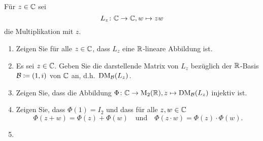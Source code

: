 \begin{question}
 Für $z \in \mathbb{C}$ sei
 \[
  L_z \colon \mathbb{C} \to \mathbb{C}, w \mapsto z w
 \]
 die Multiplikation mit $z$.
 \begin{enumerate}
  \item
   Zeigen Sie für alle $z \in \mathbb{C}$, dass $L_z$ eine $\mathbb{R}$-lineare Abbildung ist.
  \item
   Es sei $z \in \mathbb{C}$. Geben Sie die darstellende Matrix von $L_z$ bezüglich der $\mathbb{R}$-Basis $\mathcal{B} \coloneqq (1,i)$ von $\mathbb{C}$ an, d.h.\ $\operatorname{DM}_{\mathcal{B}}(L_z)$.
  \item
   Zeigen Sie, dass die Abbildung $\Phi \colon \mathbb{C} \to \operatorname{M}_2(\mathbb{R}), z \mapsto \operatorname{DM}_{\mathcal{B}}(L_z)$ injektiv ist.
  \item
   Zeigen Sie, dass $\Phi(1) = I_2$ und dass für alle $z, w \in \mathbb{C}$
   \[
    \Phi(z+w) = \Phi(z) + \Phi(w)
    \quad \text{und} \quad
    \Phi(z \cdot w) = \Phi(z) \cdot \Phi(w).
   \]
  \item
 \end{enumerate}
\end{question}
